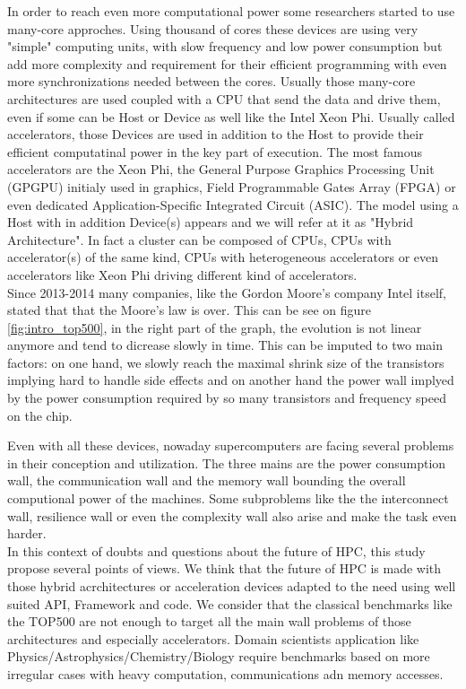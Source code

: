 In order to reach even more computational power some researchers started to use many-core approches. 
Using thousand of cores these devices are using very "simple" computing units, with slow frequency and low power consumption but add more complexity and requirement for their efficient programming with even more synchronizations needed between the cores. 
Usually those many-core architectures are used coupled with a CPU that send the data and drive them, even if some can be Host or Device as well like the Intel Xeon Phi. 
Usually called accelerators, those Devices are used in addition to the Host to provide their efficient computatinal power in the key part of execution. 
The most famous accelerators are the Xeon Phi, the General Purpose Graphics Processing Unit (GPGPU) initialy used in graphics, Field Programmable Gates Array (FPGA) or even dedicated Application-Specific Integrated Circuit (ASIC).
The model using a Host with in addition Device(s) appears and we will refer at it as "Hybrid Architecture".
In fact a cluster can be composed of CPUs, CPUs with accelerator(s) of the same kind, CPUs with heterogeneous accelerators or even accelerators like Xeon Phi driving different kind of accelerators.\\

Since 2013-2014 many companies, like the Gordon Moore's company Intel itself, stated that that the Moore's law is over. 
This can be see on figure \ref{fig:intro_top500}, in the right part of the graph, the evolution is not linear anymore and tend to dicrease slowly in time. 
This can be imputed to two main factors: on one hand, we slowly reach the maximal shrink size of the transistors implying hard to handle side effects and on another hand the power wall implyed by the power consumption required by so many transistors and frequency speed on the chip.

Even with all these devices, nowaday supercomputers are facing several problems in their conception and utilization. 
The three mains are the power consumption wall, the communication wall and the memory wall bounding the overall computional power of the machines.  
Some subproblems like the the interconnect wall, resilience wall or even the complexity wall also arise and make the task even harder.\\

In this context of doubts and questions about the future of HPC, this study propose several points of views. 
We think that the future of HPC is made with those hybrid acrchitectures or acceleration devices adapted to the need using well suited API, Framework and code.
We consider that the classical benchmarks like the TOP500 are not enough to target all the main wall problems of those architectures and especially accelerators. 
Domain scientists application like Physics/Astrophysics/Chemistry/Biology require benchmarks based on more irregular cases with heavy computation, communications adn memory accesses. 

